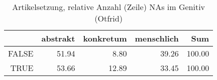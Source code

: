 \begin{table}[ht]
\centering
\begin{tabular}{rrrrr}
  \hline
 & abstrakt & konkretum & menschlich & Sum \\ 
  \hline
FALSE & 51.94 & 8.80 & 39.26 & 100.00 \\ 
  TRUE & 53.66 & 12.89 & 33.45 & 100.00 \\ 
   \hline
\end{tabular}
\caption{Artikelsetzung, relative Anzahl (Zeile) NAs im Genitiv (Otfrid)} 
\end{table}
